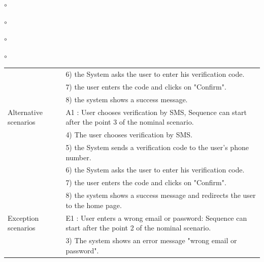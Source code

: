 \documentclass[]{uc2pfecaneva}
\begin{document}
\begin{list}{$\circ$}{}
\begin{list}{$\circ$}{}
\begin{list}{$\circ$}{}
\begin{list}{$\circ$}{}
\begin{table}[h]
\begin{tabularx}{\textwidth}{|l|X|}
            & 6) the System asks the user to enter his verification code.                                                                                                          \\
            & 7) the user enters the code and clicks on "Confirm".                                                                                                                 \\
            & 8) the system shows a success message.                                                                                                                               \\ \hline
            Alternative scenarios
            & A1 : User chooses verification by SMS,  Sequence can start after the point 3 of the nominal scenario.                                                                \\
            & \hspace{4mm}4) The user chooses verification by SMS.                                                                                                               \\
            & \hspace{4mm}5) the System sends a verification code to the user's phone number.                                                                                    \\
            & \hspace{4mm}6) the System asks the user to enter his verification code.                                                                                            \\
            & \hspace{4mm}7) the user enters the code and clicks on "Confirm".                                                                                                   \\
            & \hspace{4mm}8) the system shows a success message and redirects the user to the home page.                                                                         \\ \hline
            Exception scenarios
            & E1 : User enters a wrong email or password: Sequence can start after the point 2 of the nominal scenario.                                                            \\
            & \hspace{4mm}3) The system shows an error message "wrong email or password".                                                                                        \\

\end{tabularx}
\end{table}
\end{list}
\end{list}
\end{list}
\end{list}
\end{document}
